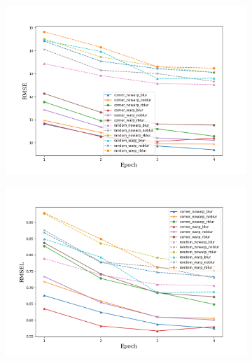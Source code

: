 \begin{figure}
\begin{adjustwidth}{-0.2\textwidth}{-0.2\textwidth}
        \begin{subfigure}{0.6\textwidth}
            \includegraphics[width=\textwidth]{figs/rmse}
        \end{subfigure}
        \hspace{0cm}
        \begin{subfigure}{0.6\textwidth}
            \includegraphics[width=\textwidth]{figs/rmse_log}
        \end{subfigure}
        \hspace{0cm}
        \begin{subfigure}{0.6\textwidth}

\end{subfigure}
\end{adjustwidth}
\end{figure}
